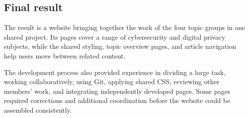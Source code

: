 \subsection{Final result}
\label{sec:result}

The result is a website bringing together the work of the four topic groups in one shared project.
Its pages cover a range of cybersecurity and digital privacy subjects, while the shared styling, topic overview pages, and article navigation help users move between related content.

The development process also provided experience in dividing a large task, working collaboratively, using Git, applying shared CSS, reviewing other members' work, and integrating independently developed pages.
Some pages required corrections and additional coordination before the website could be
assembled consistently.

